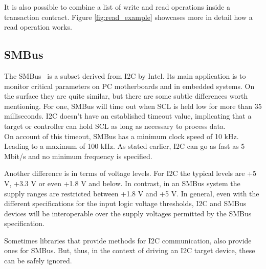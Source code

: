 It is also possible to combine a list of write and read operations inside a transaction contract.
Figure \ref{fig:read_example} showcases more in detail how a read operation works.

\subsection{SMBus}

The \gls{SMBus}~\cite{smbus} is a subset derived from \gls{I2C} by Intel. Its main application is to monitor critical parameters on PC motherboards and in embedded systems. On the surface they are quite similar, but there are some subtle differences worth mentioning. For one, \gls{SMBus} will time out when \gls{SCL} is held low for more than 35 milliseconds. \gls{I2C} doesn't have an established timeout value, implicating that a target or controller can hold \gls{SCL} as long as necessary to process data. \\
On account of this timeout, \gls{SMBus} has a minimum clock speed of 10 kHz. Leading to a maximum of 100 kHz. As stated earlier, \gls{I2C} can go as fast as 5 Mbit/s and no minimum frequency is specified.

Another difference is in terms of voltage levels. For \gls{I2C} the typical levels are +5 V, +3.3 V or even +1.8 V and below. In contrast, in an \gls{SMBus} system the supply ranges are restricted between +1.8 V and +5 V. In general, even with the different specifications for the input logic voltage thresholds, \gls{I2C} and \gls{SMBus} devices will be interoperable over the supply voltages permitted by the SMBus specification.

Sometimes libraries that provide methods for \gls{I2C} communication, also provide ones for \gls{SMBus}. But, thus, in the context of driving an \gls{I2C} target device, these can be safely ignored.

